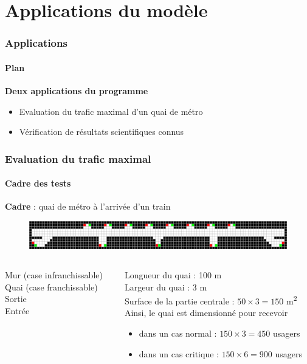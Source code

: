 \section{Applications du modèle}

\begin{frame}
    \frametitle{Applications}
    \framesubtitle{Plan}
    \textbf{Deux applications du programme}\\
    \begin{itemize}
        \item <2-> Evaluation du trafic maximal d'un quai de métro
        \item <3-> Vérification de résultats scientifiques connus
    \end{itemize}
\end{frame}


\begin{frame}
    \frametitle{Evaluation du trafic maximal}
    \framesubtitle{Cadre des tests}
    \textbf{Cadre} : quai de métro à l'arrivée d'un train \\[.3cm]
    \begin{figure}
        \includegraphics[width=1\textwidth]{figures/Fig05}
    \end{figure}
    \begin{columns}
        \begin{column}{0.35\textwidth}
            \tiny{\quad Mur (case infranchissable) \\
                \quad Quai (case franchissable) \\
                \quad Sortie \\
                \quad Entrée \\}
        \end{column}
        \begin{column}{0.7\textwidth}
             Longueur du quai : \num{100} \si{\metre} \\
             Largeur du quai : \num{3} \si{\metre}  \\
            \bigskip
             Surface de la partie centrale : $50 \times 3 = 150$ \si{\metre \squared}   \\[.5cm]
             Ainsi, le quai est dimensionné pour recevoir
            \begin{itemize}
                \item <6-> dans un cas normal : $150 \times 3 = 450$ usagers
                \item <7-> dans un cas critique : $150 \times 6 = 900$ usagers
            \end{itemize}
        \end{column}
    \end{columns}
\end{frame}


